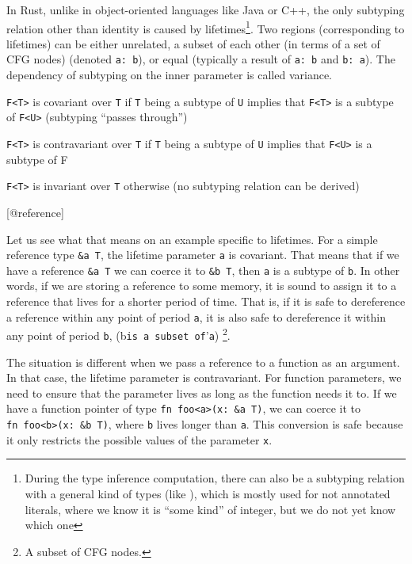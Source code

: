 \documentclass[
  11pt,
]{report}
\renewenvironment{quote}{\begin{myquote}}{\end{myquote}}
\begin{document}
In Rust, unlike in object-oriented languages like Java or C++, the only
subtyping relation other than identity is caused by
lifetimes\footnote{During the type inference computation, there can also
  be a subtyping relation with a general kind of types (like ), which is
  mostly used for not annotated literals, where we know it is ``some
  kind'' of integer, but we do not yet know which one}. Two regions
(corresponding to lifetimes) can be either unrelated, a subset of each
other (in terms of a set of CFG nodes) (denoted
\texttt{\textquotesingle{}a:\ \textquotesingle{}b}), or equal (typically
a result of \texttt{\textquotesingle{}a:\ \textquotesingle{}b} and
\texttt{\textquotesingle{}b:\ \textquotesingle{}a}). The dependency of
subtyping on the inner parameter is called variance.

\begin{quote}
\texttt{F\textless{}T\textgreater{}} is covariant over \texttt{T} if
\texttt{T} being a subtype of \texttt{U} implies that
\texttt{F\textless{}T\textgreater{}} is a subtype of
\texttt{F\textless{}U\textgreater{}} (subtyping ``passes through'')

\texttt{F\textless{}T\textgreater{}} is contravariant over \texttt{T} if
\texttt{T} being a subtype of \texttt{U} implies that
\texttt{F\textless{}U\textgreater{}} is a subtype of F

\texttt{F\textless{}T\textgreater{}} is invariant over \texttt{T}
otherwise (no subtyping relation can be derived)

{[}@reference{]}
\end{quote}

Let us see what that means on an example specific to lifetimes. For a
simple reference type \texttt{\&\textquotesingle{}a\ T}, the lifetime
parameter \texttt{\textquotesingle{}a} is covariant. That means that if
we have a reference \texttt{\&\textquotesingle{}a\ T} we can coerce it
to \texttt{\&\textquotesingle{}b\ T}, then \texttt{\textquotesingle{}a}
is a subtype of \texttt{\textquotesingle{}b}. In other words, if we are
storing a reference to some memory, it is sound to assign it to a
reference that lives for a shorter period of time. That is, if it is
safe to dereference a reference within any point of period
\texttt{\textquotesingle{}a}, it is also safe to dereference it within
any point of period \texttt{\textquotesingle{}b},
(\texttt{\textquotesingle{}}b\texttt{is\ a\ subset\ of}'\texttt{a})
\footnote{A subset of CFG nodes.}.

The situation is different when we pass a reference to a function as an
argument. In that case, the lifetime parameter is contravariant. For
function parameters, we need to ensure that the parameter lives as long
as the function needs it to. If we have a function pointer of type
\texttt{fn\ foo\textless{}\textquotesingle{}a\textgreater{}(x:\ \&\textquotesingle{}a\ T)},
we can coerce it to
\texttt{fn\ foo\textless{}\textquotesingle{}b\textgreater{}(x:\ \&\textquotesingle{}b\ T)},
where \texttt{\textquotesingle{}b} lives longer than
\texttt{\textquotesingle{}a}. This conversion is safe because it only
restricts the possible values of the parameter \texttt{x}.
\end{document}
